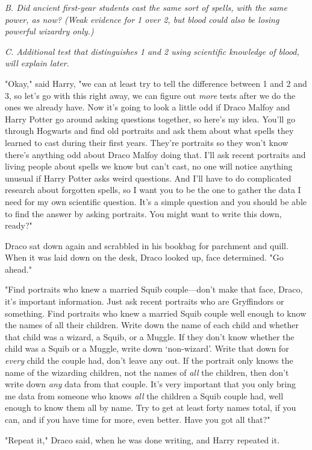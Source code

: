 \emph{B. Did ancient first-year students cast the same sort of spells, with the
same power, as now? (Weak evidence for 1 over 2, but blood could also be losing
powerful wizardry only.)}

\emph{C. Additional test that distinguishes 1 and 2 using scientific knowledge
of blood, will explain later.}

"Okay," said Harry, "we can at least try to tell the difference between 1 and 2
and 3, so let's go with this right away, we can figure out \emph{more} tests
after we do the ones we already have. Now it's going to look a little odd if
Draco Malfoy and Harry Potter go around asking questions together, so here's my
idea. You'll go through Hogwarts and find old portraits and ask them about what
spells they learned to cast during their first years. They're portraits so they
won't know there's anything odd about Draco Malfoy doing that. I'll ask recent
portraits and living people about spells we know but can't cast, no one will
notice anything unusual if Harry Potter asks weird questions. And I'll have to
do complicated research about forgotten spells, so I want you to be the one to
gather the data I need for my own scientific question. It's a simple question
and you should be able to find the answer by asking portraits. You might want
to write this down, ready?"

Draco sat down again and scrabbled in his bookbag for parchment and quill. When
it was laid down on the desk, Draco looked up, face determined. "Go ahead."

"Find portraits who knew a married Squib couple---don't make that face, Draco,
it's important information. Just ask recent portraits who are Gryffindors or
something. Find portraits who knew a married Squib couple well enough to know
the names of all their children. Write down the name of each child and whether
that child was a wizard, a Squib, or a Muggle. If they don't know whether the
child was a Squib or a Muggle, write down `non-wizard'. Write that down for
\emph{every} child the couple had, don't leave any out. If the portrait only
knows the name of the wizarding children, not the names of \emph{all} the
children, then don't write down \emph{any} data from that couple. It's very
important that you only bring me data from someone who knows \emph{all} the
children a Squib couple had, well enough to know them all by name. Try to get
at least forty names total, if you can, and if you have time for more, even
better. Have you got all that?"

"Repeat it," Draco said, when he was done writing, and Harry repeated it.

